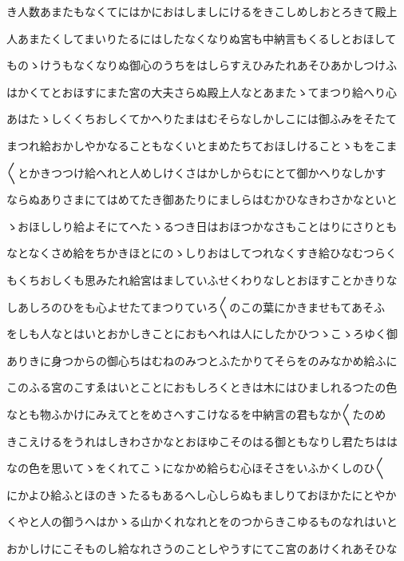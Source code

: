 \documentclass[a4paper,11pt,landscape]{ltjtarticle}
\begin{document}
\par\medskip
き人数あまたもなくてにはかにおはしましにけるをきこしめしおとろきて殿上
\par\medskip
人あまたくしてまいりたるにはしたなくなりぬ宮も中納言もくるしとおほして
\par\medskip
ものゝけうもなくなりぬ御心のうちをはしらすえひみたれあそひあかしつけふ
\par\medskip
はかくてとおほすにまた宮の大夫さらぬ殿上人なとあまたゝてまつり給へり心
\par\medskip
あはたゝしくくちおしくてかへりたまはむそらなしかしこには御ふみをそたて
\par\medskip
まつれ給おかしやかなることもなくいとまめたちておほしけることゝもをこま
\par\medskip
〱とかきつつけ給へれと人めしけくさはかしからむにとて御かへりなしかす
\par\medskip
ならぬありさまにてはめてたき御あたりにましらはむかひなきわさかなといと
\par\medskip
ゝおほししり給よそにてへたゝるつき日はおほつかなさもことはりにさりとも
\par\medskip
なとなくさめ給をちかきほとにのゝしりおはしてつれなくすき給ひなむつらく
\par\medskip
もくちおしくも思みたれ給宮はましていふせくわりなしとおほすことかきりな
\par\medskip
しあしろのひをも心よせたてまつりていろ〱のこの葉にかきませもてあそふ
\par\medskip
をしも人なとはいとおかしきことにおもへれは人にしたかひつゝこゝろゆく御
\par\medskip
ありきに身つからの御心ちはむねのみつとふたかりてそらをのみなかめ給ふに
\par\medskip
このふる宮のこすゑはいとことにおもしろくときは木にはひましれるつたの色
\par\medskip
なとも物ふかけにみえてとをめさへすこけなるを中納言の君もなか〱たのめ
\par\medskip
きこえけるをうれはしきわさかなとおほゆこそのはる御ともなりし君たちはは
\par\medskip
なの色を思いてゝをくれてこゝになかめ給らむ心ほそさをいふかくしのひ〱
\par\medskip
にかよひ給ふとほのきゝたるもあるへし心しらぬもましりておほかたにとやか
\par\medskip
くやと人の御うへはかゝる山かくれなれとをのつからきこゆるものなれはいと
\par\medskip
おかしけにこそものし給なれさうのことしやうすにてこ宮のあけくれあそひな
\par\medskip
\end{document}
